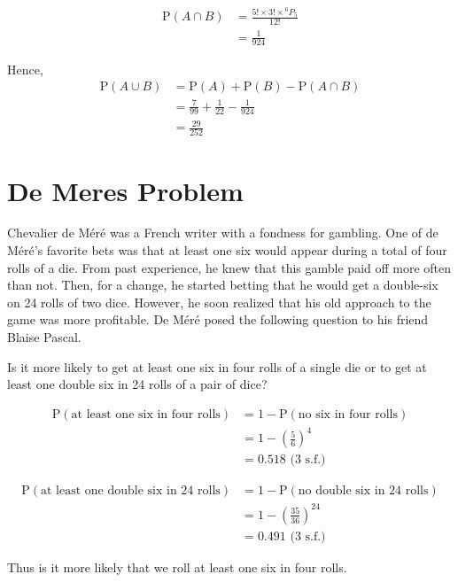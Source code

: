 \documentclass[11pt,a4paper]{book}
\begin{document}
\begin{example}
\begin{enumerate}[label=(\alph*)]
\begin{align*}
\text{P}\left(A\cap B\right) & =\frac{5!\times3!\times{}^{6}P_{5}}{12!}\\
 & =\frac{1}{924}
\end{align*}

Hence,
\begin{align*}
\text{P}\left(A\cup B\right) & =\text{P}\left(A\right)+\text{P}\left(B\right)-\text{P}\left(A\cap B\right)\\
 & =\frac{7}{99}+\frac{1}{22}-\frac{1}{924}\\
 & =\frac{29}{252}
\end{align*}

\end{enumerate}
\end{example}

\newpage{}

\section{De Meres Problem}

Chevalier de Méré was a French writer with a fondness for gambling. One of de Méré's favorite bets was that at least one six would appear during a total of four rolls of a die. From past experience, he knew that this gamble paid off more often than not. Then, for a change, he started betting that he would get a double-six on 24 rolls of two dice. However, he soon realized that his old approach to the game was more profitable. De Méré posed the following question to his friend Blaise Pascal.

\begin{example}

Is it more likely to get at least one six in four rolls
of a single die or to get at least one double six in 24 rolls
of a pair of dice?

\Solution

\begin{align*}
\text{P}\left(\text{at least one six in four rolls}\right) & =1-\text{P}\left(\text{no six in four rolls}\right)\\
 & =1-\left(\frac{5}{6}\right)^{4}\\
 & =0.518\text{ (3 s.f.)}
\end{align*}

\begin{align*}
\text{P}\left(\text{at least one double six in 24 rolls}\right) & =1-\text{P}\left(\text{no double six in 24 rolls}\right)\\
 & =1-\left(\frac{35}{36}\right)^{24}\\
 & =0.491\text{ (3 s.f.)}
\end{align*}

Thus is it more likely that we roll at least one six in four rolls.

\end{example}
\end{document}
